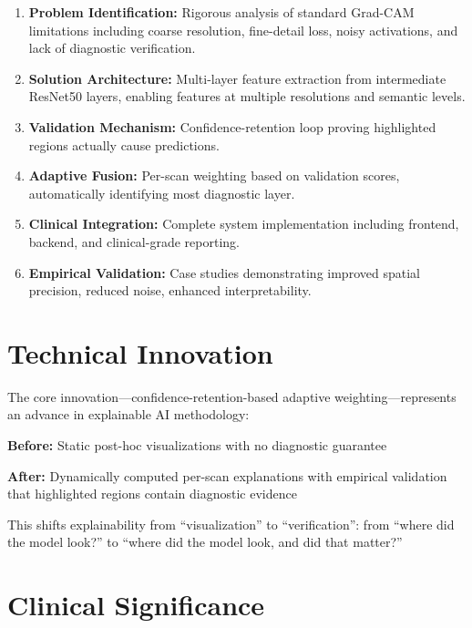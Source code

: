 \documentclass[12pt,a4paper,oneside]{book}
\begin{document}
\begin{enumerate}
  \item \textbf{Problem Identification:} Rigorous analysis of standard Grad-CAM limitations including coarse resolution, fine-detail loss, noisy activations, and lack of diagnostic verification.
  
  \item \textbf{Solution Architecture:} Multi-layer feature extraction from intermediate ResNet50 layers, enabling features at multiple resolutions and semantic levels.
  
  \item \textbf{Validation Mechanism:} Confidence-retention loop proving highlighted regions actually cause predictions.
  
  \item \textbf{Adaptive Fusion:} Per-scan weighting based on validation scores, automatically identifying most diagnostic layer.
  
  \item \textbf{Clinical Integration:} Complete system implementation including frontend, backend, and clinical-grade reporting.
  
  \item \textbf{Empirical Validation:} Case studies demonstrating improved spatial precision, reduced noise, enhanced interpretability.
\end{enumerate}

\section{Technical Innovation}

The core innovation—confidence-retention-based adaptive weighting—represents an advance in explainable AI methodology:

\textbf{Before:} Static post-hoc visualizations with no diagnostic guarantee

\textbf{After:} Dynamically computed per-scan explanations with empirical validation that highlighted regions contain diagnostic evidence

This shifts explainability from ``visualization'' to ``verification'': from ``where did the model look?'' to ``where did the model look, and did that matter?''

\section{Clinical Significance}
\end{document}
